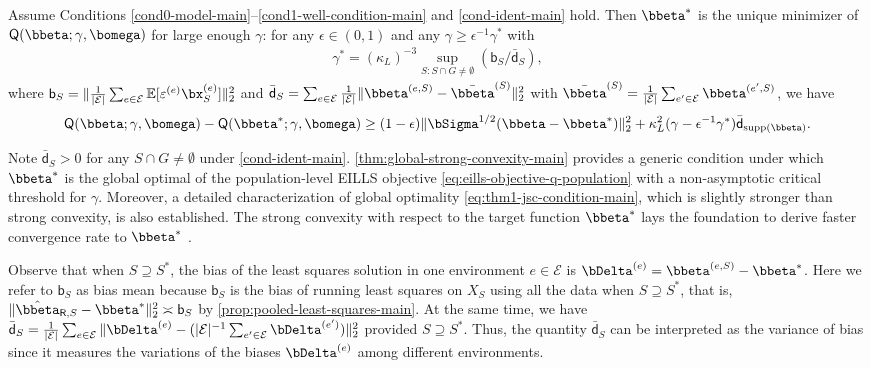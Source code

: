 \documentclass[10pt]{article}
\numberwithin{equation}{section}
\newcommand*{\supp}{\mathrm{supp}}
\begin{document}
{\begin{theorem} 
\label{thm:global-strong-convexity-main}
Assume Conditions \ref{cond0-model-main}--\ref{cond1-well-condition-main} and \ref{cond-ident-main} hold. Then $\bbeta^*$ is the unique minimizer of $\mathsf{Q}(\bbeta;\gamma, \bomega)$ for large enough $\gamma$: for any $\epsilon \in (0, 1)$ and any $\gamma\ge \epsilon^{-1} \gamma^*$ with
\begin{align}
\label{eq:thm1-gamma-star-main}
    \gamma^* = (\kappa_L)^{-3} \sup_{S: S\cap G \neq \emptyset} \left(\mathsf{b}_S/\bar{\mathsf{d}}_S\right),
\end{align} where $\mathsf{b}_S = \|\frac{1}{|\mathcal{E}|}\sum_{e\in \mathcal{E}} \mathbb{E} [\varepsilon^{(e)} \bx_S^{(e)}] \|^2_2$ and $\bar{\mathsf{d}}_S = \sum_{e\in \mathcal{E}} \frac{1}{|\mathcal{E}|} \|\bbeta^{(e,S)} - \bar{\bbeta}^{(S)}\|_2^2$
 with $\bar{\bbeta}^{(S)}=\frac{1}{|\mathcal{E}|} \sum_{e'\in \mathcal{E}} \bbeta^{(e',S)}$, we have
\begin{align}
\label{eq:thm1-jsc-condition-main}
    \mathsf{Q}(\bbeta;\gamma, \bomega) - \mathsf{Q}(\bbeta^*;\gamma, \bomega) \ge (1-\epsilon) \|\bSigma^{1/2}(\bbeta - \bbeta^*)\|_2^2 + \kappa_L^2 (\gamma - \epsilon^{-1}\gamma^*) \bar{\mathsf{d}}_{\supp(\bbeta)}.
\end{align}
\end{theorem}

Note $\bar{\mathsf{d}}_S>0$ for any $S\cap G \neq \emptyset$ under \cref{cond-ident-main}. \cref{thm:global-strong-convexity-main} provides a generic condition under which $\bbeta^*$ is the global optimal of the population-level EILLS objective \eqref{eq:eills-objective-q-population} with a non-asymptotic critical threshold for $\gamma$. Moreover, a detailed characterization of global optimality \eqref{eq:thm1-jsc-condition-main}, which is slightly stronger than strong convexity, is also established.  The strong convexity with respect to the target function $\bbeta^*$ lays the foundation to derive faster convergence rate to $\bbeta^*$ \citep{van1996weak, wainwright2019high}.

\begin{remark}
Observe that when $S\supseteq S^*$, the bias of the least squares solution in one environment $e\in \mathcal{E}$ is $\bDelta^{(e)} = \bbeta^{(e,S)} - \bbeta^*$. Here we refer to $\mathsf{b}_S$ as bias mean because $\mathsf{b}_S$ is the bias of running least squares on $X_S$ using all the data when $S\supseteq S^*$, that is, $\|\hat{\bbeta}_{\mathsf{R}, S} - \bbeta^*\|_2^2 \asymp \mathsf{b}_S$ by  \cref{prop:pooled-least-squares-main}. At the same time, we have $\bar{\mathsf{d}}_S = \frac{1}{|\mathcal{E}|} \sum_{e\in \mathcal{E}} \|\bDelta^{(e)} - (|\mathcal{E}|^{-1}\sum_{e'\in \mathcal{E}} \bDelta^{(e')})\|_2^2$ provided $S\supseteq S^*$. Thus, the quantity $\bar{\mathsf{d}}_S$ can be interpreted as the variance of bias since it measures the variations of the biases $\bDelta^{(e)}$ among different environments.
\end{remark}

}
\end{document}
